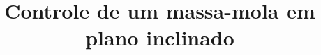 \documentclass{relatorio}
\title{Controle de um massa-mola em plano inclinado}
\begin{document}
  
  
  \maketitle{}

  
  
  \nocite{*}
  \printbibliography{}
\end{document}
